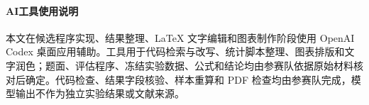 \paragraph*{AI工具使用说明}
\small 本文在候选程序实现、结果整理、\LaTeX{} 文字编辑和图表制作阶段使用 OpenAI Codex 桌面应用辅助。工具用于代码检索与改写、统计脚本整理、图表排版和文字润色；题面、评估程序、冻结实验数据、公式和结论均由参赛队依据原始材料核对后确定。代码检查、结果字段核验、样本重算和 PDF 检查均由参赛队完成，模型输出不作为独立实验结果或文献来源。
